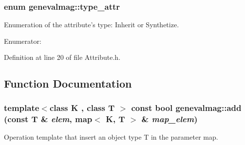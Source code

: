 \hypertarget{namespacegenevalmag_a0ae71e3da3851df63075a93820da40af}{
\subsubsection[{type\_\-attr}]{\setlength{\rightskip}{0pt plus 5cm}enum {\bf genevalmag::type\_\-attr}}}
\label{namespacegenevalmag_a0ae71e3da3851df63075a93820da40af}
Enumeration of the attribute's type: Inherit or Synthetize. \begin{Desc}
\item[Enumerator: ]\par
\begin{description}
\item[{\em 
\hypertarget{namespacegenevalmag_a0ae71e3da3851df63075a93820da40afadab09b74118524cf39af82012b2a106f}{
k\_\-inherit}
\label{namespacegenevalmag_a0ae71e3da3851df63075a93820da40afadab09b74118524cf39af82012b2a106f}
}]\item[{\em 
\hypertarget{namespacegenevalmag_a0ae71e3da3851df63075a93820da40afa15c3e71b1d6d4bb754427989b1685fe9}{
k\_\-synthetize}
\label{namespacegenevalmag_a0ae71e3da3851df63075a93820da40afa15c3e71b1d6d4bb754427989b1685fe9}
}]\end{description}
\end{Desc}



Definition at line 20 of file Attribute.h.



\subsection{Function Documentation}
\hypertarget{namespacegenevalmag_a95d75ecfcb4371b57086093c66a96bd4}{
\subsubsection[{add}]{\setlength{\rightskip}{0pt plus 5cm}template$<$class K , class T $>$ const bool genevalmag::add (const T \& {\em elem}, \/  map$<$ K, T $>$ \& {\em map\_\-elem})}}
\label{namespacegenevalmag_a95d75ecfcb4371b57086093c66a96bd4}
Operation template that insert an object type T in the parameter map.

